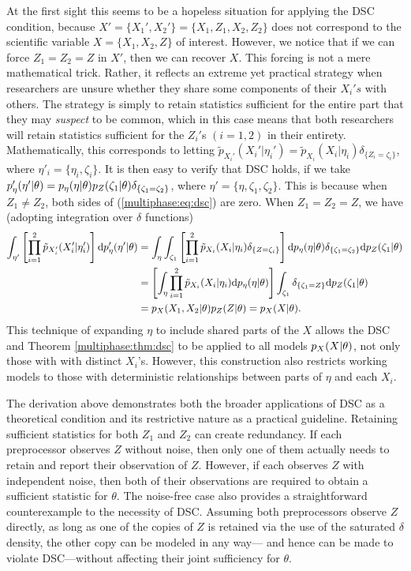 At the first sight this seems to be a hopeless  situation for applying the DSC condition, because $X'=\{X_1', X_2'\}=\{X_1, Z_1, X_2, Z_2\}$ does not correspond to the scientific variable $X=\{X_1, X_2, Z\}$ of interest.
However, we notice that if we can force $Z_1=Z_2=Z$ in $X'$, then we can recover $X$.
This forcing is not a mere mathematical trick.
Rather, it reflects an extreme yet practical strategy when researchers are unsure whether they share some components of their $X_i's$ with others.
The strategy is simply to retain statistics sufficient for the entire part that they may \textit{suspect} to be common, which in this case means that both researchers will retain statistics sufficient for the $Z_i'$s $(i=1,2)$ in their entirety.
Mathematically, this corresponds to letting $\tilde p_{X_i'}(X_i' |\eta_i')= \tilde p_{X_i}(X_i |\eta_i)\delta_{\{Z_i=\zeta_i\}}$, where $\eta'_i=\{\eta_i,\zeta_i\}$.
 It is then easy to verify that DSC holds, if we take 
$p_\eta'(\eta' | \theta)=p_\eta(\eta | \theta)p_{Z}(\zeta_1|\theta)\delta_{\{\zeta_1=\zeta_2\}}$, where $\eta'=\{\eta, \zeta_1, \zeta_2\}.$ This is because when $Z_1\not= Z_2$,  both sides of (\ref{multiphase:eq:dsc}) are zero. When $Z_1=Z_2=Z$, we have (adopting integration over $\delta$ functions)
\begin{align*}
\int_{\eta'}\left[ \prod_{i=1}^2 \tilde p_{X_i'}(X_i' |\eta_i')  \right]\mathrm{d} p_\eta'( \eta' | \theta) & = \int_\eta\int_{\zeta_1}\left[ \prod_{i=1}^2 \tilde p_{X_i}(X_i |\eta_i)\delta_{\{Z=\zeta_i\}}  \right]\mathrm{d} p_\eta( \eta | \theta)
\delta_{\{\zeta_1=\zeta_2\}}\mathrm{d} p_{Z}(\zeta_1|\theta)  \\
& =  \left[ \int_\eta\prod_{i=1}^2 \tilde p_{X_i}(X_i |\eta_i)\mathrm{d} p_\eta( \eta | \theta)\right] \int_{\zeta_1}
\delta_{\{\zeta_1=Z\}}\mathrm{d} p_{Z}(\zeta_1|\theta) \\
& =p_{X_{}}(X_1, X_2|\theta)p_{Z}(Z|\theta)=p_{X}(X|\theta).
\end{align*}
This technique of expanding $\eta$ to include shared parts of the $X$ allows the DSC and Theorem \ref{multiphase:thm:dsc} to be applied to all models $p_X(X | \theta)$, not only those with with distinct $X_i$'s.
However, this construction also restricts working models to those with deterministic relationships between parts of $\eta$ and each $X_i$.

The derivation above demonstrates both the broader applications of DSC as a theoretical condition and its restrictive nature as a practical guideline. Retaining sufficient statistics for both $Z_1$ and $Z_2$ can create redundancy.
%
If each preprocessor observes $Z$ without noise, then only one of them actually needs to retain and report their observation of $Z$.
However, if each observes $Z$ with independent noise, then both of their observations are required to obtain a sufficient statistic for $\theta$.
%
The noise-free case also provides a straightforward counterexample to the necessity of DSC. Assuming both preprocessors observe $Z$ directly, as long as one of the copies of $Z$ is retained via the use of the saturated  $\delta$ density, the other copy can be modeled in any way--- and hence can be made to violate DSC---without affecting their joint sufficiency for $\theta$.

